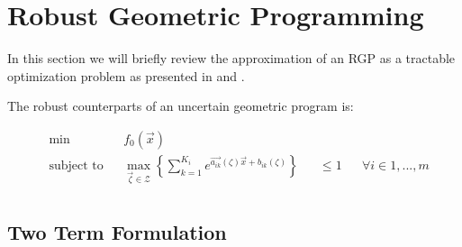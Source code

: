 \section{Robust Geometric Programming} \label{RGP}
In this section we will briefly review the approximation of an RGP as a tractable optimization problem as presented in \cite{saab2018} and \cite{hsiung_kim_boyd_2007}.

The robust counterparts of an uncertain geometric program is:

\begin{equation}
\begin{aligned}
& \min &&f_0\left(\vec{x}\right)\\
& \text{subject to} &&\max_{\vec{\zeta} \in \mathcal{Z}} \left\{\textstyle{\sum}_{k=1}^{K_i}e^{\vec{a_{ik}}\left(\zeta\right)\vec{x} + b_{ik}\left(\zeta\right)}\right\} &&\leq 1 &&\forall i \in 1,...,m\\
\end{aligned}
\label{GP_counterparts_finite}
\end{equation}

\subsection{Two Term Formulation}
 